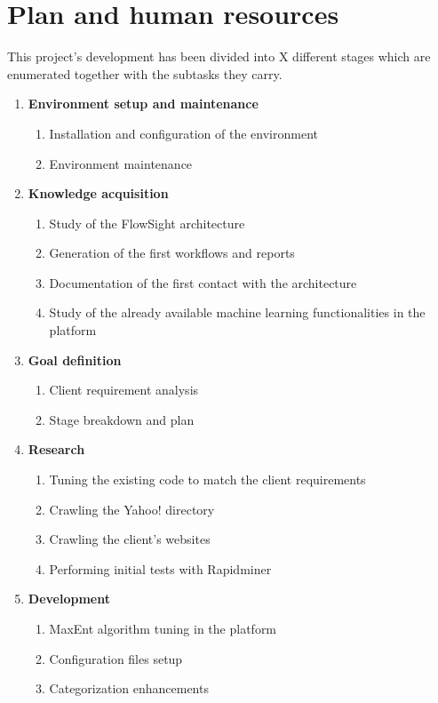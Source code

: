 \section{Plan and human resources}
This project's development has been divided into X different stages which are enumerated together with the subtasks they carry.
\begin{enumerate}
  \item \textbf{Environment setup and maintenance}
  \begin{enumerate}
    \item Installation and configuration of the environment
    \item Environment maintenance
  \end{enumerate}
  \item \textbf{Knowledge acquisition}
  \begin{enumerate}
    \item Study of the FlowSight architecture
    \item Generation of the first workflows and reports
    \item Documentation of the first contact with the architecture
    \item Study of the already available machine learning functionalities in the platform
  \end{enumerate}
  \item \textbf{Goal definition}
  \begin{enumerate}
    \item Client requirement analysis   
    \item Stage breakdown and plan
  \end{enumerate}
  \item \textbf{Research}
  \begin{enumerate}
    \item Tuning the existing code to match the client requirements
    \item Crawling the Yahoo! directory
    \item Crawling the client's websites
    \item Performing initial tests with Rapidminer
  \end{enumerate}
  \item \textbf{Development}
  \begin{enumerate}
    \item MaxEnt algorithm tuning in the platform
    \item Configuration files setup
    \item Categorization enhancements

\end{enumerate}
\end{enumerate}
